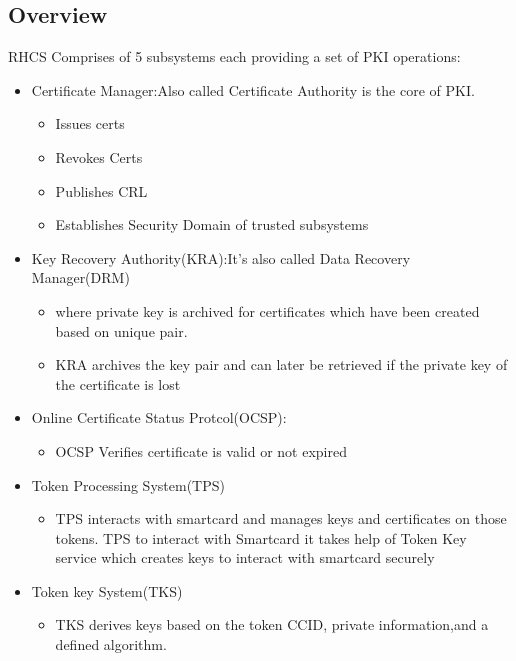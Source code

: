\documentclass[12pt]{report}
\begin{document}
\subsection{Overview}
    RHCS Comprises of 5 subsystems each providing a set of PKI operations:
    \begin{itemize}
        \item Certificate Manager:Also called Certificate Authority is the core of PKI.
            \begin{itemize}
                \item Issues certs
                \item Revokes Certs
                \item Publishes CRL
                \item Establishes Security Domain of trusted subsystems
            \end{itemize}
        \item Key Recovery Authority(KRA):It's also called Data Recovery Manager(DRM) 
            \begin{itemize}
                \item where private key is archived for certificates which have been created based on unique pair. 
                \item KRA archives the key pair and can later be retrieved if the private key of the certificate is lost
            \end{itemize}
        \item Online Certificate Status Protcol(OCSP): 
            \begin{itemize}
                \item OCSP Verifies certificate is valid or not expired
            \end{itemize}
        \item Token Processing System(TPS)
            \begin{itemize}
                \item TPS interacts with smartcard and manages keys and certificates on those tokens. TPS to interact
                    with Smartcard it takes help of Token Key service which creates keys to interact with smartcard securely
            \end{itemize}
        \item Token key System(TKS)
            \begin{itemize}
                \item TKS derives keys based on the token CCID, private information,and a defined algorithm. 

\end{itemize}
\end{itemize}
\end{document}

